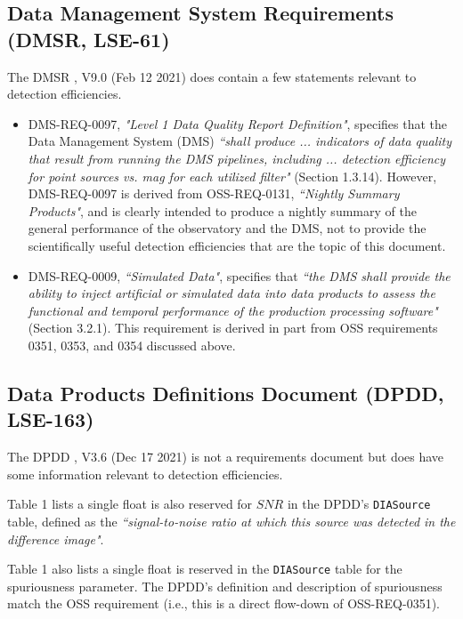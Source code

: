 \subsection{Data Management System Requirements (DMSR, LSE-61)}\label{ssec:docs_dmsr}

The DMSR , V9.0 (Feb 12 2021) does contain a few statements relevant to detection efficiencies. 

\begin{itemize}

\item DMS-REQ-0097, {\it "Level 1 Data Quality Report Definition"}, specifies that the Data Management System (DMS) {\it ``shall produce ... indicators of data quality that result from running the DMS pipelines, including ... detection efficiency for point sources vs. mag for each utilized filter"} (Section 1.3.14).
However, DMS-REQ-0097 is derived from OSS-REQ-0131, {\it ``Nightly Summary Products"}, and is clearly intended to produce a nightly summary of the general performance of the observatory and the DMS, not to provide the scientifically useful detection efficiencies that are the topic of this document. 

\item DMS-REQ-0009, {\it ``Simulated Data"}, specifies that {\it ``the DMS shall provide the ability to inject artificial or simulated data into data products to assess the functional and temporal performance of the production processing software"} (Section 3.2.1).
This requirement is derived in part from OSS requirements 0351, 0353, and 0354 discussed above.

\end{itemize}


\subsection{Data Products Definitions Document (DPDD, LSE-163)}\label{ssec:docs_dpdd}

The DPDD , V3.6 (Dec 17 2021) is not a requirements document but does have some information relevant to detection efficiencies.

Table 1 lists a single float is also reserved for ${SNR}$ in the DPDD's {\tt DIASource} table, defined as the {\it ``signal-to-noise ratio at which this source was detected in the difference image"}.

Table 1 also lists a single float is reserved in the {\tt DIASource} table for the spuriousness parameter.
The DPDD's definition and description of spuriousness match the OSS requirement (i.e., this is a direct flow-down of OSS-REQ-0351).

